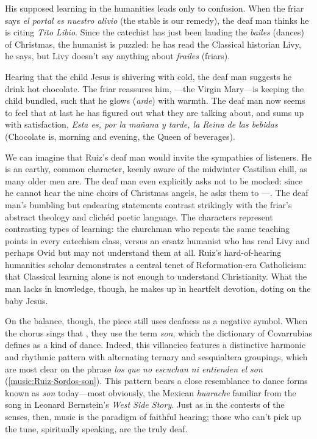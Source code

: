 His supposed learning in the humanities leads only to confusion.
When the friar says \emph{el portal es nuestro alivio} (the stable is our
remedy), the deaf man thinks he is citing \emph{Tito Libio}.
Since the catechist has just been lauding the \emph{bailes} (dances) of
Christmas, the humanist is puzzled: he has read the Classical historian Livy, he
says, but Livy doesn't say anything about \emph{frailes} (friars).

Hearing that the child Jesus is shivering with cold, the deaf man suggests he
drink hot chocolate.
The friar reassures him, ---the Virgin Mary---is keeping the
child bundled, such that he glows (\emph{arde}) with warmth.
The deaf man now seems to feel that at last he has figured out what they are
talking about, and sums up with satisfaction, \emph{Esta es, por la mañana y
tarde, la Reina de las bebidas} (Chocolate is, morning and evening, the Queen of
beverages).

We can imagine that Ruiz's deaf man would invite the sympathies of listeners.
He is an earthy, common character, keenly aware of the midwinter Castilian
chill, as many older men are.
The deaf man even explicitly asks not to be mocked: since he cannot hear the
nine choirs of Christmas angels, he asks them to ---.
The deaf man's bumbling but endearing statements contrast strikingly with the
friar's abstract theology and clichéd poetic language.
The characters represent contrasting types of learning: the churchman who
repeats the same teaching points in every catechism class, versus an ersatz
humanist who has read Livy and perhaps Ovid but may not understand them at all.
Ruiz's hard-of-hearing humanities scholar demonstrates a central tenet of
Reformation-era Catholicism: that Classical learning alone is not enough to
understand Christianity.%
    \Autocite
    [206{Erasmus perceived in the paganistic trends of the Renaissance
    a greater threat to religion than the theological squabbles he was so
    reluctant to participate in}.] 
    {Erasmus:Dolan}
What the man lacks in knowledge, though, he makes up in heartfelt devotion,
doting on the baby Jesus.

On the balance, though, the piece still uses deafness as a negative symbol.
When the chorus sings that , they use the term \emph{son}, which the dictionary of
Covarrubias defines as a kind of dance.
Indeed, this villancico features a distinctive harmonic and rhythmic pattern
with alternating ternary and sesquialtera groupings, which are most clear on the
phrase \emph{los que no escuchan ni entienden el son}
(\cref{music:Ruiz-Sordos-son}).
This pattern bears a close resemblance to dance forms known as \emph{son}
today---most obviously, the Mexican \emph{huarache} familiar from the song
 in Leonard Bernstein's \emph{West Side Story}.%
    \Autocites
    []{Grove}
    {Wells:WestSideStory}
Just as in the contests of the senses, then, music is the paradigm of faithful
hearing; those who can't pick up the tune, spiritually speaking, are the truly
deaf.

